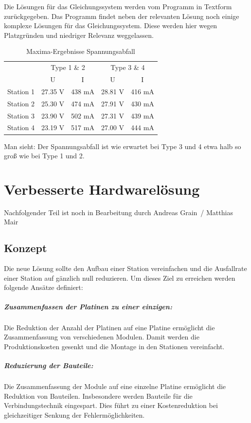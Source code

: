 \documentclass[a4paper, twoside, 12pt, openright]{memoir}
\newcommand{\AndreasGrain}{Andreas Grain}
\newcommand{\MatthiasMair}{Matthias Mair}
\newcommand{\authorName}{\AndreasGrain\ / \MatthiasMair}
\newcommand{\wip}{{\color{red}Nachfolgender Teil ist noch in Bearbeitung durch \authorName}}
\begin{document}
Die Lösungen für das Gleichungssystem werden vom Programm in Textform zurückgegeben.
Das Programm findet neben der relevanten Lösung noch einige komplexe Lösungen für das Gleichungssystem.
Diese werden hier wegen Platzgründen und niedriger Relevanz weggelassen.
\begin{table}
	\centering
	\begin{tabular}{|r|c|c|c|c|}
		\hline
		&\multicolumn{2}{c|}{Type 1 \& 2}&\multicolumn{2}{c|}{Type 3 \& 4}\\\cline{2-5}
		&U&I&U&I\\
		\midrule
		Station 1&27.35 V&438 mA&28.81 V&416 mA\\\hline
		Station 2&25.30 V&474 mA&27.91 V&430 mA\\\hline
		Station 3&23.90 V&502 mA&27.31 V&439 mA\\\hline
		Station 4&23.19 V&517 mA&27.00 V&444 mA\\
		\hline
	\end{tabular}
	\caption{Maxima-Ergebnisse Spannungsabfall}
\end{table}
Man sieht: Der Spannungsabfall ist wie erwartet bei Type 3 und 4 etwa halb so groß wie bei Type 1 und 2.


\chapter{Verbesserte Hardwarelösung}
\wip
\section{Konzept}
Die neue Lösung sollte den Aufbau einer Station vereinfachen und die Ausfallrate einer Station auf gänzlich null reduzieren.
Um dieses Ziel zu erreichen werden folgende Ansätze definiert:

\paragraph{Zusammenfassen der Platinen zu einer einzigen:}
Die Reduktion der Anzahl der Platinen auf eine Platine ermöglicht die Zusammenfassung von verschiedenen Modulen.
Damit werden die Produktionskosten gesenkt und die Montage in den Stationen vereinfacht.

\paragraph{Reduzierung der Bauteile:}
Die Zusammenfassung der Module auf eine einzelne Platine ermöglicht die Reduktion von Bauteilen.
Insbesondere werden Bauteile für die Verbindungstechnik eingespart.
Dies führt zu einer Kostenreduktion bei gleichzeitiger Senkung der Fehlermöglichkeiten. 
\end{document}
